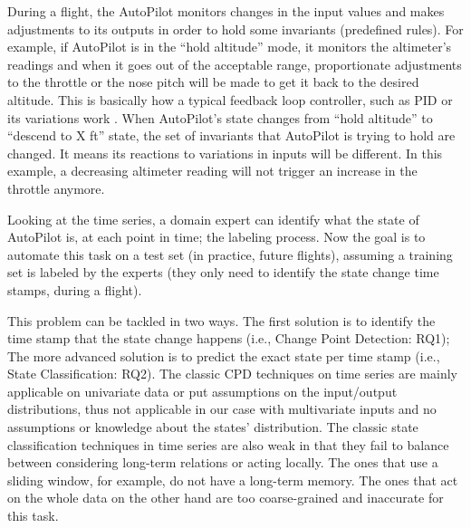 

During a flight, the AutoPilot monitors changes in the input values and makes adjustments to its outputs in order to hold some invariants (predefined rules). 
For example, if AutoPilot is in the ``hold altitude'' mode, it monitors the altimeter's readings and when it goes out of the acceptable range, proportionate adjustments to the throttle or the nose pitch will be made to get it back to the desired altitude. This is basically how a typical feedback loop controller, such as PID or its variations work \cite{feedbacksystemsBook}.
When AutoPilot's state changes from ``hold altitude'' to ``descend to X ft'' state, the set of invariants that AutoPilot is trying to hold are changed. It means its reactions to variations in inputs will be different. In this example, a decreasing altimeter reading will not trigger an increase in the throttle anymore.

Looking at the time series, a domain expert can identify what the state of AutoPilot is, at each point in time; the labeling process. Now the goal is to automate this task on a test set (in practice, future flights), assuming a training set is labeled by the experts (they only need to identify the state change time stamps, during a flight). 

This problem can be tackled in two ways. The first solution is to identify the time stamp that the state change happens (i.e., Change Point Detection: RQ1); The more advanced solution is to predict the exact state per time stamp (i.e., State Classification: RQ2). The classic CPD techniques on time series \cite{Truong2018ChangePointSurvey} are mainly applicable on univariate data or put assumptions on the input/output distributions, thus not applicable in our case with multivariate inputs and no assumptions or knowledge about the states' distribution. The classic state classification techniques in time series are also weak in that %
they fail to balance between considering long-term relations or acting locally. The ones that use a sliding window, for example, do not have a long-term memory. The ones that act on the whole data on the other hand are too coarse-grained and inaccurate for this task.

